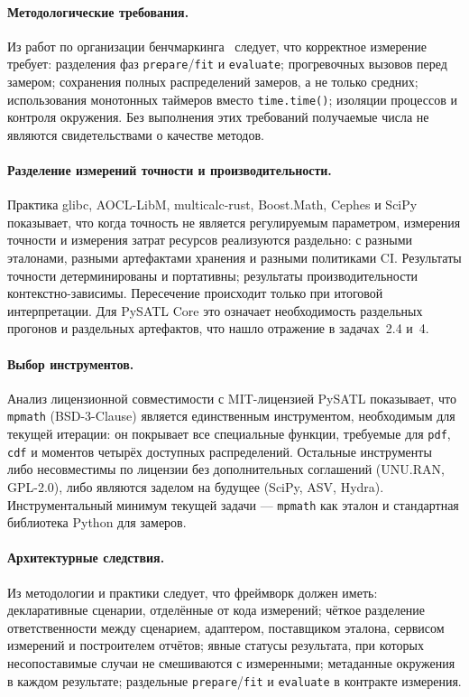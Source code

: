 \documentclass[12pt,a4paper]{article}
\begin{document}
\paragraph{Методологические требования.}
Из работ по организации бенчмаркинга~\cite{arkshin2019,benchmarkdotnet}
следует, что корректное измерение требует: разделения фаз
\texttt{prepare}/\texttt{fit} и \texttt{evaluate}; прогревочных
вызовов перед замером; сохранения полных распределений замеров,
а не только средних; использования монотонных таймеров вместо
\texttt{time.time()}; изоляции процессов и контроля окружения.
Без выполнения этих требований получаемые числа не являются
свидетельствами о качестве методов.

\paragraph{Разделение измерений точности и производительности.}
Практика glibc, AOCL-LibM, multicalc-rust, Boost.Math, Cephes
и SciPy показывает, что когда точность не является регулируемым
параметром, измерения точности и измерения затрат ресурсов
реализуются раздельно: с разными эталонами, разными артефактами
хранения и разными политиками CI. Результаты точности
детерминированы и портативны; результаты производительности
контекстно-зависимы. Пересечение происходит только при итоговой
интерпретации. Для PySATL Core это означает необходимость
раздельных прогонов и раздельных артефактов, что нашло отражение
в задачах~2.4 и~4.

\paragraph{Выбор инструментов.}
Анализ лицензионной совместимости с MIT-лицензией PySATL
показывает, что \texttt{mpmath} (BSD-3-Clause) является
единственным инструментом, необходимым для текущей итерации:
он покрывает все специальные функции, требуемые для
\texttt{pdf}, \texttt{cdf} и моментов четырёх доступных
распределений. Остальные инструменты либо несовместимы по
лицензии без дополнительных соглашений (UNU.RAN, GPL-2.0),
либо являются заделом на будущее (SciPy, ASV, Hydra).
Инструментальный минимум текущей задачи --- \texttt{mpmath}
как эталон и стандартная библиотека Python для замеров.

\paragraph{Архитектурные следствия.}
Из методологии и практики следует, что фреймворк должен
иметь: декларативные сценарии, отделённые от кода измерений;
чёткое разделение ответственности между сценарием, адаптером,
поставщиком эталона, сервисом измерений и построителем
отчётов; явные статусы результата, при которых несопоставимые
случаи не смешиваются с измеренными; метаданные окружения
в каждом результате; раздельные \texttt{prepare}/\texttt{fit}
и \texttt{evaluate} в контракте измерения.
\end{document}
